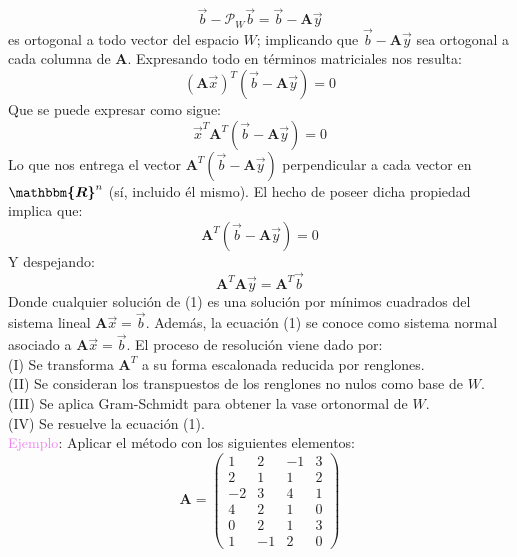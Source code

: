 \documentclass[11pt]{article}
\theoremstyle{definition}
\def\R{\boldsymbol{\mathbbm{R}}}
\begin{document}
\begin{enumerate}[(i)]
\begin{equation*}
\vec{b} - \mathcal{P}_{W}\vec{b} = \vec{b} - \textbf{A}\vec{y}
\end{equation*}
es ortogonal a todo vector del espacio $W$; implicando que $\vec{b} - \textbf{A}\vec{y}$ sea ortogonal a cada columna de $\textbf{A}$. Expresando todo en t\'erminos matriciales nos resulta:
\begin{equation*}
\left(\textbf{A}\vec{x}\right)^{T} \left(\vec{b} - \textbf{A}\vec{y}\right) = 0
\end{equation*}
Que se puede expresar como sigue:
\begin{equation*}
\vec{x}^{T}\textbf{A}^{T} \left(\vec{b} - \textbf{A}\vec{y}\right) = 0
\end{equation*}
Lo que nos entrega el vector $\textbf{A}^{T} \left(\vec{b} - \textbf{A}\vec{y}\right)$ perpendicular a cada vector en $\R^{n}$ (s\'i, incluido \'el mismo). El hecho de poseer dicha propiedad implica que:
\begin{equation*}
\textbf{A}^{T} \left(\vec{b} - \textbf{A}\vec{y}\right) = 0
\end{equation*}
Y despejando:
\begin{equation}
\textbf{A}^{T}\textbf{A}\vec{y} =\textbf{A}^{T}\vec{b}
\end{equation}
Donde cualquier soluci\'on de (1) es una soluci\'on por m\'inimos cuadrados del sistema lineal $\textbf{A}\vec{x} = \vec{b}$. Adem\'as, la ecuaci\'on (1) se conoce como sistema normal asociado a $\textbf{A}\vec{x} = \vec{b}$. El proceso de resoluci\'on viene dado por:\\
(I) Se transforma $\textbf{A}^{T}$ a su forma escalonada reducida por renglones.\\
(II) Se consideran los transpuestos de los renglones no nulos como base de $W$.\\
(III) Se aplica Gram-Schmidt para obtener la vase ortonormal de $W$.\\
(IV) Se resuelve la ecuaci\'on (1).\\
\vspace{2mm} %
\textcolor{violet}{Ejemplo}: Aplicar el m\'etodo con los siguientes elementos:
\begin{equation*}
\textbf{A} =
\begin{pmatrix}
1 & 2 & -1 & 3\\
2 & 1 & 1 & 2\\
-2 & 3 & 4 & 1\\
4 & 2 & 1 & 0\\
0 & 2 & 1 & 3\\
1 & -1 & 2 & 0

\end{pmatrix}
\end{equation*}
\end{enumerate}
\end{document}
